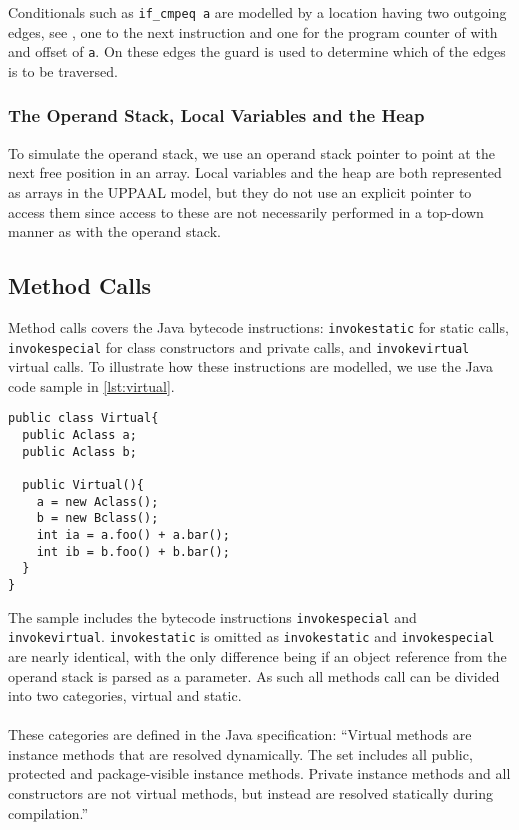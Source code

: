 Conditionals such as \texttt{if\_cmpeq a} are modelled by a location having two outgoing edges, see , one to the next instruction and one for the program counter of with and offset of \texttt{a}. On these edges the guard is used to determine which of the edges is to be traversed.

\subsubsection{The Operand Stack, Local Variables and the Heap}
To simulate the operand stack, we use an operand stack pointer to point at the next free position in an array. Local variables and the heap are both represented as arrays in the UPPAAL model, but they do not use an explicit pointer to access them since access to these are not necessarily performed in a top-down manner as with the operand stack.

\subsection{Method Calls}\label{subsubsec:method}
Method calls covers the Java bytecode instructions: \texttt{invokestatic} for static calls, \texttt{invokespecial} for class constructors and private calls, and \texttt{invokevirtual} virtual calls. To illustrate how these instructions are modelled, we use the Java code sample in \cref{lst:virtual}.
\begin{lstlisting}[caption={\texttt{Bclass} extends \texttt{Aclass}, \texttt{Aclass} implements the methods foo and bar, and \texttt{Bclass} overwrites foo.}, label={lst:virtual}]
public class Virtual{
  public Aclass a;
  public Aclass b;

  public Virtual(){
    a = new Aclass();
    b = new Bclass();
    int ia = a.foo() + a.bar();
    int ib = b.foo() + b.bar();
  }
}
\end{lstlisting}
The sample includes the bytecode instructions \texttt{invokespecial} and \texttt{invokevirtual}.
\texttt{invokestatic} is omitted as \texttt{invokestatic} and \texttt{invokespecial} are nearly identical, with the only difference being if an object reference from the operand stack is parsed as a parameter.
As such all methods call can be divided into two categories, virtual and static.\\\\
These categories are defined in the Java specification: ``Virtual methods are instance methods that are resolved dynamically. The set includes all public, protected and package-visible instance methods. Private instance methods and all constructors are not virtual methods, but instead are resolved statically during compilation.''~\cite[chap. 4.3.7.6]{java_card_spec}

